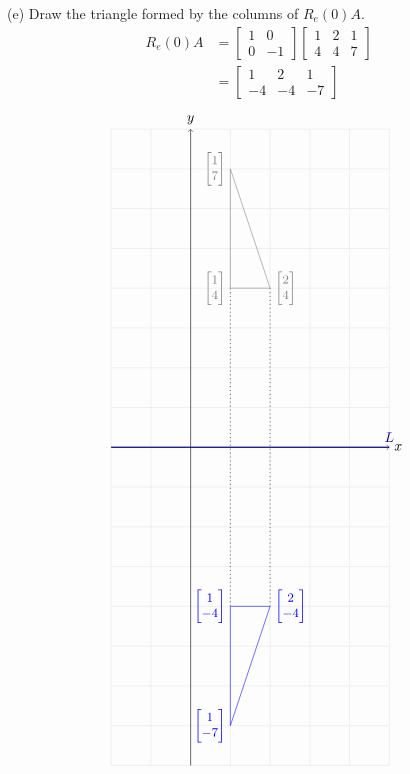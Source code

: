 \pagebreak
(e) Draw the triangle formed by the columns of $R_e(0)A$.
\begin{align*}
    R_e(0)A &= \begin{bmatrix}
        1&0\\0&-1
    \end{bmatrix} \begin{bmatrix}
        1 & 2 & 1\\4 & 4 & 7
    \end{bmatrix}\\&= \begin{bmatrix}
        1 & 2 & 1\\-4 & -4 & -7
    \end{bmatrix}
\end{align*}
\begin{gather*}
    \begin{tikzpicture}
        \coordinate (O) at (0,0);
        \draw[thin,gray!20] (-2,-8) grid (5,8);
        \draw[->] (-2,0)--(5,0) node[right]{$x$};
        \draw[->] (0,-8)--(0,8) node[above]{$y$};
        \draw [black!40!blue, thick] (-2, 0) -- (5, 0) node[anchor=south]{$L$};
        \draw[gray] (1,4) node[anchor=east]{$\small\begin{bmatrix}1\\ 4\end{bmatrix}$}
            -- (2,4) node[anchor=west]{$\small\begin{bmatrix}2\\ 4\end{bmatrix}$}
            -- (1,7) node[anchor=east]{$\small\begin{bmatrix}1\\ 7\end{bmatrix}$}
            -- cycle;
        \draw[blue] (1,-4) node[anchor=east]{$\small\begin{bmatrix}1\\ -4\end{bmatrix}$}
            -- (2,-4) node[anchor=west]{$\small\begin{bmatrix}2\\ -4\end{bmatrix}$}
            -- (1,-7) node[anchor=east]{$\small\begin{bmatrix}1\\ -7\end{bmatrix}$}
            -- cycle;
        \draw [gray, thick,dotted] (1,4) -- (1,-4);
        \draw [gray, thick,dotted] (2,4) -- (2,-4);
    \end{tikzpicture}
\end{gather*}

